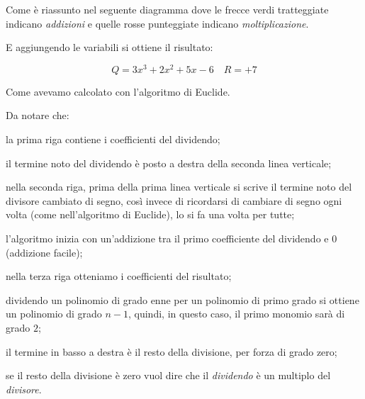 Come è riassunto nel seguente diagramma dove le frecce 
verdi tratteggiate indicano \emph{addizioni} e quelle 
rosse punteggiate indicano \emph{moltiplicazione}.

\begin{inaccessibleblock}
\begin{center}
% 
\ruffinid
\end{center}
\end{inaccessibleblock}

E aggiungendo le variabili si ottiene il risultato:

\[Q = 3 x^3 +2 x^2 +5 x -6 \quad R = +7\]

Come avevamo calcolato con l'algoritmo di Euclide.

Da notare che:
\begin{itemize*}
 \item la prima riga contiene i coefficienti del dividendo;
 \item il termine noto del dividendo è posto a destra della seconda linea 
  verticale;
 \item nella seconda riga, prima della prima linea verticale si scrive il 
  termine noto del divisore cambiato di segno, così invece di ricordarsi di 
  cambiare di segno ogni volta (come nell'algoritmo di Euclide), lo si fa una 
  volta per tutte;
 \item l'algoritmo inizia con un'addizione tra il primo coefficiente del 
  dividendo e \(0\) (addizione facile);
 \item nella terza riga otteniamo i coefficienti del risultato;
 \item dividendo un polinomio di grado enne per un polinomio di primo grado 
  si ottiene un polinomio di grado \(n-1\), quindi, in questo caso, il primo 
  monomio sarà di grado \(2\);
 \item il termine in basso a destra è il resto della divisione, per forza di 
  grado zero;
 \item se il resto della divisione è zero vuol dire che il \emph{dividendo} è 
  un multiplo del \emph{divisore}.
\end{itemize*}


